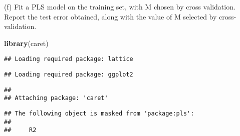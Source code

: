 \documentclass[
  ignorenonframetext,
]{beamer}
\newenvironment{Shaded}{\begin{snugshade}}{\end{snugshade}}
\newcommand{\CommentTok}[1]{\textcolor[rgb]{0.56,0.35,0.01}{\textit{#1}}}
\newcommand{\DataTypeTok}[1]{\textcolor[rgb]{0.13,0.29,0.53}{#1}}
\newcommand{\DecValTok}[1]{\textcolor[rgb]{0.00,0.00,0.81}{#1}}
\newcommand{\KeywordTok}[1]{\textcolor[rgb]{0.13,0.29,0.53}{\textbf{#1}}}
\newcommand{\NormalTok}[1]{#1}
\newcommand{\OperatorTok}[1]{\textcolor[rgb]{0.81,0.36,0.00}{\textbf{#1}}}
\newcommand{\StringTok}[1]{\textcolor[rgb]{0.31,0.60,0.02}{#1}}
\begin{document}
\begin{frame}[fragile]{(f) Fit a PLS model on the training set, with M
chosen by cross validation. Report the test error obtained, along with
the value of M selected by cross-validation.}
\protect\hypertarget{f-fit-a-pls-model-on-the-training-set-with-m-chosen-by-cross-validation.-report-the-test-error-obtained-along-with-the-value-of-m-selected-by-cross-validation.}{}

\begin{Shaded}
\begin{Highlighting}[]
\KeywordTok{library}\NormalTok{(caret)}
\end{Highlighting}
\end{Shaded}

\begin{verbatim}
## Loading required package: lattice
\end{verbatim}

\begin{verbatim}
## Loading required package: ggplot2
\end{verbatim}

\begin{verbatim}
## 
## Attaching package: 'caret'
\end{verbatim}

\begin{verbatim}
## The following object is masked from 'package:pls':
## 
##     R2
\end{verbatim}

\begin{Shaded}
\end{Shaded}
\end{frame}
\end{document}
